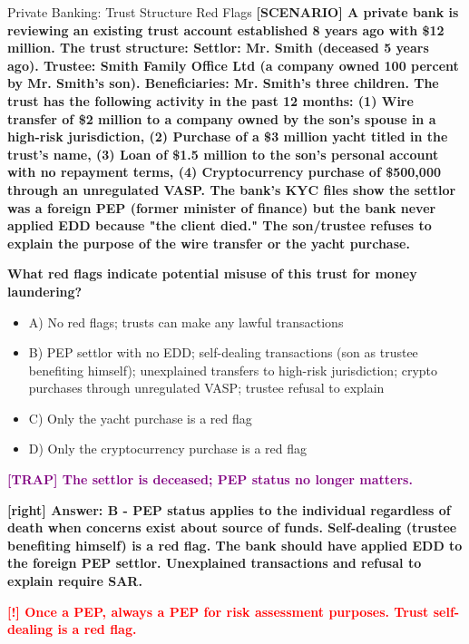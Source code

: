 \documentclass[11pt,a4paper]{beamer}
\newcommand{\redflag}[1]{\textcolor{red}{\textbf{[!] #1}}}
\newcommand{\trap}[1]{\textcolor{purple}{\textbf{[TRAP] #1}}}
\newcommand{\correct}[1]{\textcolor{green!50!black}{\textbf{[right] #1}}}
\newcommand{\scenario}[1]{\textcolor{blue!70!black}{\textbf{[SCENARIO] #1}}}
\begin{document}
	
	\begin{frame}{Private Banking: Trust Structure Red Flags}
		\tiny
		\scenario{A private bank is reviewing an existing trust account established 8 years ago with \$12 million. The trust structure: Settlor: Mr. Smith (deceased 5 years ago). Trustee: Smith Family Office Ltd (a company owned 100 percent by Mr. Smith's son). Beneficiaries: Mr. Smith's three children. The trust has the following activity in the past 12 months: (1) Wire transfer of \$2 million to a company owned by the son's spouse in a high-risk jurisdiction, (2) Purchase of a \$3 million yacht titled in the trust's name, (3) Loan of \$1.5 million to the son's personal account with no repayment terms, (4) Cryptocurrency purchase of \$500,000 through an unregulated VASP. The bank's KYC files show the settlor was a foreign PEP (former minister of finance) but the bank never applied EDD because "the client died." The son/trustee refuses to explain the purpose of the wire transfer or the yacht purchase.}
		
		\vspace{0.02cm}
		\textbf{What red flags indicate potential misuse of this trust for money laundering?}
		\vspace{0.02cm}
		
		\begin{itemize}
			\item A) No red flags; trusts can make any lawful transactions
			\item B) PEP settlor with no EDD; self-dealing transactions (son as trustee benefiting himself); unexplained transfers to high-risk jurisdiction; crypto purchases through unregulated VASP; trustee refusal to explain
			\item C) Only the yacht purchase is a red flag
			\item D) Only the cryptocurrency purchase is a red flag
		\end{itemize}
		
		\vspace{0.02cm}
		\trap{The settlor is deceased; PEP status no longer matters.}
		
		\vspace{0.02cm}
		\correct{Answer: B - PEP status applies to the individual regardless of death when concerns exist about source of funds. Self-dealing (trustee benefiting himself) is a red flag. The bank should have applied EDD to the foreign PEP settlor. Unexplained transactions and refusal to explain require SAR.}
		
		\vspace{0.02cm}
		\redflag{Once a PEP, always a PEP for risk assessment purposes. Trust self-dealing is a red flag.}
	\end{frame}
	
\end{document}
